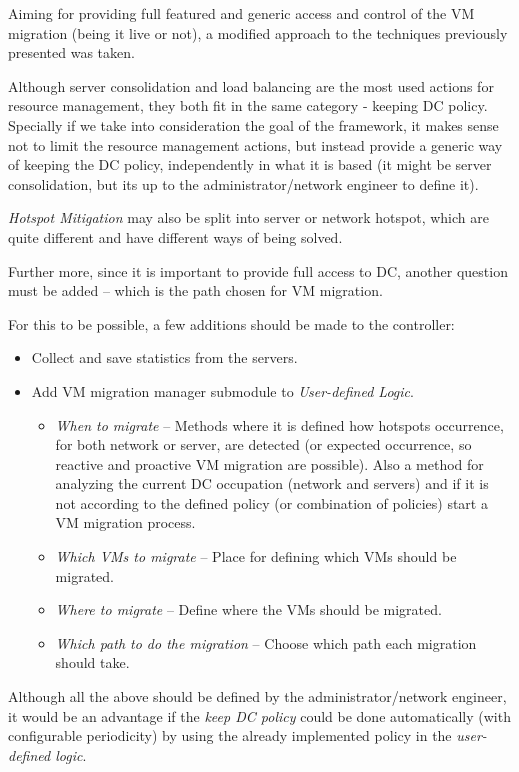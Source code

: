 \documentclass[12pt,english,oneside]{book}
\begin{document}
Aiming for providing full featured and generic access and control of the VM migration (being it live or not), a modified approach to the techniques previously presented was taken.

Although server consolidation and load balancing are the most used actions for resource management, they both fit in the same category - keeping DC policy.
Specially if we take into consideration the goal of the framework, it makes sense not to limit the resource management actions, but instead provide a generic way of keeping the DC policy, independently in what it is based (it might be server consolidation, but its up to the administrator/network engineer to define it).

\textit{Hotspot Mitigation} may also be split into server or network hotspot, which are quite different and have different ways of being solved.

Further more, since it is important to provide full access to DC, another question must be added -- which is the path chosen for VM migration.

For this to be possible, a few additions should be made to the controller:
\begin{itemize}
 \item Collect and save statistics from the servers.
 \item Add VM migration manager submodule to \textit{User-defined Logic}.
 \begin{itemize}
 \item \textit{When to migrate} -- Methods where it is defined how hotspots occurrence, for both network or server, are detected (or expected occurrence, so reactive and proactive VM migration are possible). Also a method for analyzing the current DC occupation (network and servers) and if it is not according to the defined policy (or combination of policies) start a VM migration process.
 \item \textit{Which VMs to migrate} -- Place for defining which VMs should be migrated.
 \item \textit{Where to migrate} -- Define where the VMs should be migrated.
 \item \textit{Which path to do the migration} -- Choose which path each migration should take.
 \end{itemize}
\end{itemize}

\newpage
Although all the above should be defined by the administrator/network engineer, it would be an advantage if the \textit{keep DC policy} could be done automatically (with configurable periodicity) by using the already implemented policy in the \textit{user-defined logic}.
\end{document}
